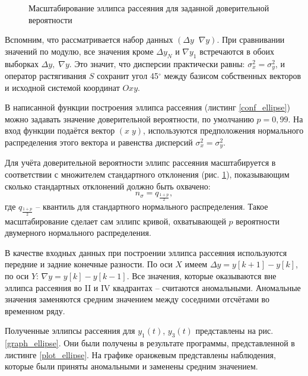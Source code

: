 \begin{figure}
	\centering
	
	\caption{Масштабирование эллипса рассеяния для заданной доверительной вероятности}
	\label{ellipse_ill}
\end{figure}


Вспомним, что рассматривается набор данных $\left( \Delta y\;\;\nabla y \right)$. При сравнивании значений по модулю, все значения кроме $\Delta y_N$ и $\nabla y_1$ встречаются в обоих выборках $\Delta y,\;\nabla y$. Это значит, что дисперсии практически равны: $\sigma^2_x = \sigma^2_y$, и оператор растягивания $S$ сохранит угол 45$^\circ$ между базисом собственных векторов и исходной системой координат $Oxy$.

В написанной функции построения эллипса рассеяния (листинг \ref{conf_ellipse}) можно задавать значение доверительной вероятности, по умолчанию $p=0,99$. На вход функции подаётся вектор $(x\;y)$, используются предположения нормального распределения этого вектора и равенства дисперсий $\sigma^2_x = \sigma^2_y$.

Для учёта доверительной вероятности эллипс рассеяния масштабируется в соответствии с множителем стандартного отклонения (рис. \ref{ellipse_ill}), показывающим сколько стандартных отклонений должно быть охвачено:
\begin{equation*}
	n_\sigma = q_{\frac{1+p}{2}},
\end{equation*}
где $q_{\frac{1+p}{2}}$ -- квантиль для стандартного нормального распределения. Такое масштабирование сделает сам эллипс кривой, охватывающей $p$ вероятности двумерного нормального распределения.

В качестве входных данных при построении эллипса рассеяния используются передние и задние конечные разности. По оси $X$ имеем $\Delta y = y[k+1] - y[k]$, по оси $Y$: $\nabla y = y[k] - y[k-1]$. Все значения, которые оказываются вне эллипса рассеяния во II и IV квадрантах -- считаются аномальными. Аномальные значения заменяются средним значением между соседними отсчётами во временном ряду.

Полученные эллипсы рассеяния для $y_1(t)$, $y_3(t)$ представлены на рис. \ref{graph_ellipse}. Они были получены в результате программы, представленной в листинге \ref{plot_ellipse}. На графике оранжевым представлены наблюдения, которые были приняты аномальными и заменены средним значением.



